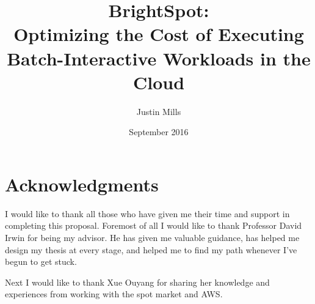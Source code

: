\documentclass[thesis,proposal]{umassthesis}  %
\begin{document}
\title{BrightSpot:\protect\\Optimizing the Cost of Executing Batch-Interactive Workloads in the Cloud
  \protect\\}
\author{Justin Mills}
\date{September 2016} %





\frontmatter
\maketitle
\copyrightpage     %
\signaturepage


\chapter{Acknowledgments}             %
  I would like to thank all those who have given me their time and support in completing this proposal. Foremost of all I would like to thank Professor David Irwin for being my advisor. He has given me valuable guidance, has helped me design my thesis at every stage, and helped me to find my path whenever I've begun to get stuck.\par
  Next I would like to thank Xue Ouyang for sharing her knowledge and experiences from working with the spot market and AWS. 
\end{document}
